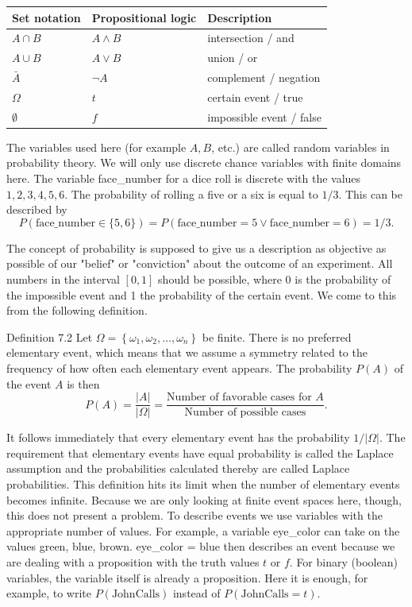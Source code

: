 \documentclass[10pt]{book}
\begin{document}
\begin{center}
\begin{tabular}{|l|l|l|}
\hline
Set notation & Propositional logic & Description \\
\hline
$A \cap B$ & $A \wedge B$ & intersection / and \\
\hline
$A \cup B$ & $A \vee B$ & union / or \\
\hline
$\bar{A}$ & $\neg A$ & complement / negation \\
\hline
$\Omega$ & $t$ & certain event / true \\
\hline
$\emptyset$ & $f$ & impossible event / false \\
\hline
\end{tabular}
\end{center}

The variables used here (for example $A, B$, etc.) are called random variables in probability theory. We will only use discrete chance variables with finite domains here. The variable face\_number for a dice roll is discrete with the values $1,2,3,4,5,6$. The probability of rolling a five or a six is equal to $1 / 3$. This can be described by
$$
P(\text{face\_number} \in \{5,6\})=P(\text{face\_number}=5 \vee \text{face\_number}=6)=1/3 .
$$

The concept of probability is supposed to give us a description as objective as possible of our "belief" or "conviction" about the outcome of an experiment. All numbers in the interval $[0,1]$ should be possible, where 0 is the probability of the impossible event and 1 the probability of the certain event. We come to this from the following definition.

Definition 7.2 Let $\Omega=\left\{\omega_{1}, \omega_{2}, \ldots, \omega_{n}\right\}$ be finite. There is no preferred elementary event, which means that we assume a symmetry related to the frequency of how often each elementary event appears. The probability $P(A)$ of the event $A$ is then
$$
P(A)=\frac{|A|}{|\Omega|}=\frac{\text{Number of favorable cases for } A}{\text{Number of possible cases}} .
$$

It follows immediately that every elementary event has the probability $1/|\Omega|$. The requirement that elementary events have equal probability is called the Laplace assumption and the probabilities calculated thereby are called Laplace probabilities. This definition hits its limit when the number of elementary events becomes infinite. Because we are only looking at finite event spaces here, though, this does not present a problem. To describe events we use variables with the appropriate number of values. For example, a variable eye\_color can take on the values green, blue, brown. eye\_color = blue then describes an event because we are dealing with a proposition with the truth values $t$ or $f$. For binary (boolean) variables, the variable itself is already a proposition. Here it is enough, for example, to write $P(\text{JohnCalls})$ instead of $P(\text{JohnCalls}=t)$.
\end{document}
